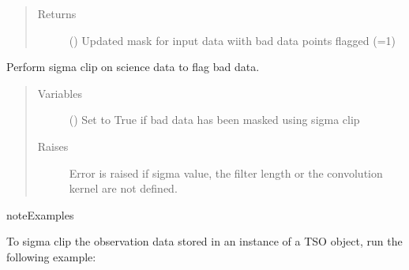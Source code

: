 \documentclass[a4paper,10pt,english]{sphinxmanual}
\begin{document}
\begin{fulllineitems}
\begin{fulllineitems}
\begin{quote}
\begin{description}
\item[{Returns}] \leavevmode
{} () \textendash{} Updated mask for input data wiith bad data points flagged (=1)

\end{description}\end{quote}

\end{fulllineitems}


\begin{fulllineitems}
\label{\detokenize{cascade.TSO:cascade.TSO.TSO.TSOSuite.sigma_clip_data}}
Perform sigma clip on science data to flag bad data.
\begin{quote}\begin{description}
\item[{Variables}] \leavevmode
{} () \textendash{} Set to True if bad data has been masked using sigma clip

\item[{Raises}] \leavevmode
{} \textendash{} Error is raised if sigma value, the filter length or
the convolution kernel are not defined.

\end{description}\end{quote}

\begin{sphinxadmonition}{note}{Examples}

To sigma clip the observation data stored in an instance of a TSO
object, run the following example:

%
\begin{sphinxVerbatim}[commandchars=\\\{\}]
\end{sphinxVerbatim}
\end{sphinxadmonition}


\end{fulllineitems}
\end{fulllineitems}
\end{document}
